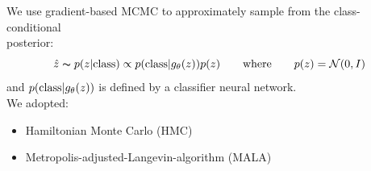 \documentclass[landscape,a0b,final,a4resizeable]{include/a0poster}
\begin{document}
\begin{poster}
\begin{multicols}{3}
We use gradient-based MCMC to approximately sample from the class-conditional \\posterior:\\
\begin{equation*}
    \hat z \thicksim p(z|\textnormal{class}) \propto p(\textnormal{class} | g_\theta(z)) p(z) \qquad \textnormal{where} \qquad p(z) = \mathcal{N}(0, I)
\end{equation*}
\linebreak
and $p(\textnormal{class} | g_\theta(z))$ is defined by a classifier neural network.\\

We adopted:
\begin{itemize}
\item Hamiltonian Monte Carlo (HMC) 
\item Metropolis-adjusted-Langevin-algorithm (MALA) 
\end{itemize}
 




\newpage 




\end{multicols}
\end{poster}
\end{document}
